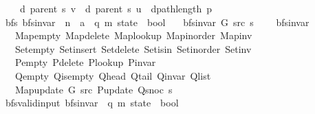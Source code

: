 \begin{isabellebody}
\ \ \ \ \ d\ {\isacharparenleft}{\kern0pt}parent\ s{\isacharparenright}{\kern0pt}\ v\ {\isasymle}\ d\ {\isacharparenleft}{\kern0pt}parent\ s{\isacharparenright}{\kern0pt}\ u\ {\isacharplus}{\kern0pt}\ dpath{\isacharunderscore}{\kern0pt}length\ p{\isachardoublequoteclose}\isanewline
%
\isadeliminvisible
\isanewline
%
\endisadeliminvisible
%
\isataginvisible
{}\isamarkupfalse%
\ {\isacharparenleft}{\kern0pt}\ bfs{\isacharparenright}{\kern0pt}\ bfs{\isacharunderscore}{\kern0pt}invar{\isacharprime}{\kern0pt}\ {\isacharcolon}{\kern0pt}{\isacharcolon}{\kern0pt}\ {\isachardoublequoteopen}{\isacharprime}{\kern0pt}n\ {\isasymRightarrow}\ {\isacharprime}{\kern0pt}a\ {\isasymRightarrow}\ {\isacharparenleft}{\kern0pt}{\isacharprime}{\kern0pt}q{\isacharcomma}{\kern0pt}\ {\isacharprime}{\kern0pt}m{\isacharparenright}{\kern0pt}\ state\ {\isasymRightarrow}\ bool{\isachardoublequoteclose}\ \isanewline
\ \ {\isachardoublequoteopen}bfs{\isacharunderscore}{\kern0pt}invar{\isacharprime}{\kern0pt}\ G\ src\ s\ {\isasymequiv}\isanewline
\ \ \ bfs{\isacharunderscore}{\kern0pt}invar\isanewline
\ \ \ \ Map{\isacharunderscore}{\kern0pt}empty\ Map{\isacharunderscore}{\kern0pt}delete\ Map{\isacharunderscore}{\kern0pt}lookup\ Map{\isacharunderscore}{\kern0pt}inorder\ Map{\isacharunderscore}{\kern0pt}inv\isanewline
\ \ \ \ Set{\isacharunderscore}{\kern0pt}empty\ Set{\isacharunderscore}{\kern0pt}insert\ Set{\isacharunderscore}{\kern0pt}delete\ Set{\isacharunderscore}{\kern0pt}isin\ Set{\isacharunderscore}{\kern0pt}inorder\ Set{\isacharunderscore}{\kern0pt}inv\isanewline
\ \ \ \ P{\isacharunderscore}{\kern0pt}empty\ P{\isacharunderscore}{\kern0pt}delete\ P{\isacharunderscore}{\kern0pt}lookup\ P{\isacharunderscore}{\kern0pt}invar\isanewline
\ \ \ \ Q{\isacharunderscore}{\kern0pt}empty\ Q{\isacharunderscore}{\kern0pt}is{\isacharunderscore}{\kern0pt}empty\ Q{\isacharunderscore}{\kern0pt}head\ Q{\isacharunderscore}{\kern0pt}tail\ Q{\isacharunderscore}{\kern0pt}invar\ Q{\isacharunderscore}{\kern0pt}list\isanewline
\ \ \ \ Map{\isacharunderscore}{\kern0pt}update\ G\ src\ P{\isacharunderscore}{\kern0pt}update\ Q{\isacharunderscore}{\kern0pt}snoc\ s{\isachardoublequoteclose}\isanewline
\isanewline
{}\isamarkupfalse%
\ {\isacharparenleft}{\kern0pt}\ bfs{\isacharunderscore}{\kern0pt}valid{\isacharunderscore}{\kern0pt}input{\isacharparenright}{\kern0pt}\ bfs{\isacharunderscore}{\kern0pt}invar{\isacharprime}{\kern0pt}{\isacharprime}{\kern0pt}\ {\isacharcolon}{\kern0pt}{\isacharcolon}{\kern0pt}\ {\isachardoublequoteopen}{\isacharparenleft}{\kern0pt}{\isacharprime}{\kern0pt}q{\isacharcomma}{\kern0pt}\ {\isacharprime}{\kern0pt}m{\isacharparenright}{\kern0pt}\ state\ {\isasymRightarrow}\ bool{\isachardoublequoteclose}\ \isanewline

\end{isabellebody}
